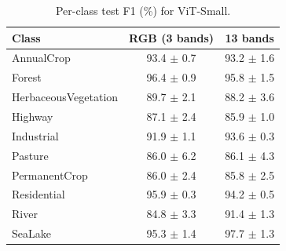 \begin{table}[t]
\centering
\caption{Per-class test F1 (\%) for ViT-Small.}
\label{tab:per_class_f1}
\small
\begin{tabular}{lcc}
\toprule
Class & RGB (3 bands) & 13 bands \\
\midrule
AnnualCrop & 93.4 $\pm$ 0.7 & 93.2 $\pm$ 1.6 \\
Forest & 96.4 $\pm$ 0.9 & 95.8 $\pm$ 1.5 \\
HerbaceousVegetation & 89.7 $\pm$ 2.1 & 88.2 $\pm$ 3.6 \\
Highway & 87.1 $\pm$ 2.4 & 85.9 $\pm$ 1.0 \\
Industrial & 91.9 $\pm$ 1.1 & 93.6 $\pm$ 0.3 \\
Pasture & 86.0 $\pm$ 6.2 & 86.1 $\pm$ 4.3 \\
PermanentCrop & 86.0 $\pm$ 2.4 & 85.8 $\pm$ 2.5 \\
Residential & 95.9 $\pm$ 0.3 & 94.2 $\pm$ 0.5 \\
River & 84.8 $\pm$ 3.3 & 91.4 $\pm$ 1.3 \\
SeaLake & 95.3 $\pm$ 1.4 & 97.7 $\pm$ 1.3 \\
\bottomrule
\end{tabular}
\end{table}

